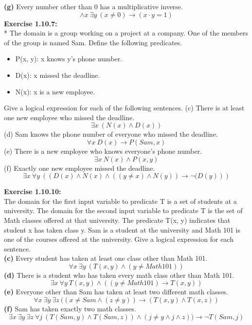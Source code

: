 \documentclass[12pt, letterpaper, twoside]{article}
\begin{document}
\noindent \textbf{(g)} Every number other than 0 has a multiplicative inverse.\\ 
\break
\[ \land x\ \exists y\ (x \neq 0) \to (x \cdot y=1) \]
\break
\newpage
\noindent \textbf{Exercise 1.10.7:} \\*
The domain is a group working on a project at a company. One of the members of the group is named Sam. Define the following predicates.
\begin{itemize}[noitemsep]
\item P(x, y): x knows y's phone number.
\item D(x): x missed the deadline.
\item N(x): x is a new employee.
\end{itemize}
\noindent Give a logical expression for each of the following sentences.
\break
\break
(c) There is at least one new employee who missed the deadline.
\[ \exists x\ (N(x) \land D(x)) \] 
\break
(d) Sam knows the phone number of everyone who missed the deadline.
\[ \forall x\ D(x)\to P(Sam,x) \]
\break
(e) There is a new employee who knows everyone's phone number.
\[ \exists x\ N(x) \land P(x,y) \]
\break
(f) Exactly one new employee missed the deadline.
\[ \exists x\ \forall y\ ((D(x) \land N(x) \land ((y \neq x) \land  N(y)) \to \neg{(}D(y))) \]





\newpage
\noindent \textbf{Exercise 1.10.10:}\\
The domain for the first input variable to predicate T is a set of students at a university. The domain for the second input variable to predicate T is the set of Math classes offered at that university. The predicate T(x, y) indicates that student x has taken class y. Sam is a student at the university and Math 101 is one of the courses offered at the university. Give a logical expression for each sentence.\\
\break
\textbf{(c)} Every student has taken at least one class other than Math 101. \\
\[ \forall x\ \exists y\ (T(x,y) \land (y \neq Math101)) \]
\textbf{(d)} There is a student who has taken every math class other than Math 101. \\
\[ \exists x\ \forall y\ T(x,y) \land ((y \neq Math101) \to T(x,y))\]
\textbf{(e)} Everyone other than Sam has taken at least two different math classes. \\
\[ \forall x\ \exists y\  \exists z\ ((x \neq Sam \land (z \neq y)) \to (T(x,y) \land T(x,z)) \]
\textbf{(f)} Sam has taken exactly two math classes. \\
\[\exists x\ \exists y\ \exists z\ \forall j\ (T(Sam, y) \land T(Sam, z)) \land (j \neq y \land j \land z)) \to \neg{T}(Sam,j) \]
\end{document}
